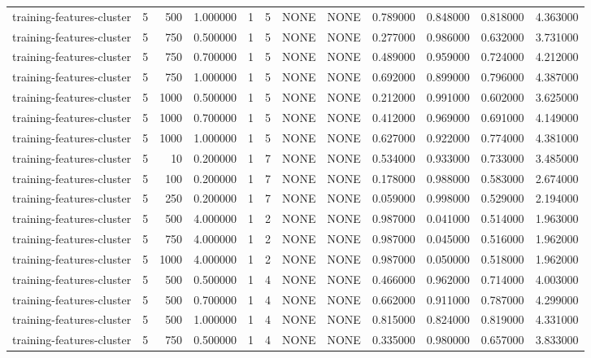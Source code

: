 \begin{tabular}{lrrrllllrrrr}
training-features-cluster & 5 & 500 & 1.000000 & 1 & 5 & NONE & NONE & 0.789000 & 0.848000 & 0.818000 & 4.363000 \\
training-features-cluster & 5 & 750 & 0.500000 & 1 & 5 & NONE & NONE & 0.277000 & 0.986000 & 0.632000 & 3.731000 \\
training-features-cluster & 5 & 750 & 0.700000 & 1 & 5 & NONE & NONE & 0.489000 & 0.959000 & 0.724000 & 4.212000 \\
training-features-cluster & 5 & 750 & 1.000000 & 1 & 5 & NONE & NONE & 0.692000 & 0.899000 & 0.796000 & 4.387000 \\
training-features-cluster & 5 & 1000 & 0.500000 & 1 & 5 & NONE & NONE & 0.212000 & 0.991000 & 0.602000 & 3.625000 \\
training-features-cluster & 5 & 1000 & 0.700000 & 1 & 5 & NONE & NONE & 0.412000 & 0.969000 & 0.691000 & 4.149000 \\
training-features-cluster & 5 & 1000 & 1.000000 & 1 & 5 & NONE & NONE & 0.627000 & 0.922000 & 0.774000 & 4.381000 \\
training-features-cluster & 5 & 10 & 0.200000 & 1 & 7 & NONE & NONE & 0.534000 & 0.933000 & 0.733000 & 3.485000 \\
training-features-cluster & 5 & 100 & 0.200000 & 1 & 7 & NONE & NONE & 0.178000 & 0.988000 & 0.583000 & 2.674000 \\
training-features-cluster & 5 & 250 & 0.200000 & 1 & 7 & NONE & NONE & 0.059000 & 0.998000 & 0.529000 & 2.194000 \\
training-features-cluster & 5 & 500 & 4.000000 & 1 & 2 & NONE & NONE & 0.987000 & 0.041000 & 0.514000 & 1.963000 \\
training-features-cluster & 5 & 750 & 4.000000 & 1 & 2 & NONE & NONE & 0.987000 & 0.045000 & 0.516000 & 1.962000 \\
training-features-cluster & 5 & 1000 & 4.000000 & 1 & 2 & NONE & NONE & 0.987000 & 0.050000 & 0.518000 & 1.962000 \\
training-features-cluster & 5 & 500 & 0.500000 & 1 & 4 & NONE & NONE & 0.466000 & 0.962000 & 0.714000 & 4.003000 \\
training-features-cluster & 5 & 500 & 0.700000 & 1 & 4 & NONE & NONE & 0.662000 & 0.911000 & 0.787000 & 4.299000 \\
training-features-cluster & 5 & 500 & 1.000000 & 1 & 4 & NONE & NONE & 0.815000 & 0.824000 & 0.819000 & 4.331000 \\
training-features-cluster & 5 & 750 & 0.500000 & 1 & 4 & NONE & NONE & 0.335000 & 0.980000 & 0.657000 & 3.833000 \\

\end{tabular}
